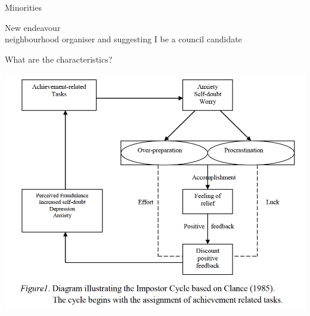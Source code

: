 \documentclass[aspectratio=169]{beamer}
\begin{document}
\begin{frame}
  \begin{center}
    \Huge Minorities
    \\ \small \cite{apa13}
  \end{center}
\end{frame}

\begin{frame}
  \begin{center}
    \Huge New endeavour
    \\ \small \cite{apa13}
     neighbourhood organiser and suggesting I be a council candidate
  \end{center}
\end{frame}

\begin{frame}
  \begin{center}
    \Huge What are the characteristics?
  \end{center}
\end{frame}

\begin{frame}
  \begin{center}
    \includegraphics[scale=.5]{./assets/clance-impostor-cycle.png}
    \\ \small \cite{sakulku11}
  \end{center}
\end{frame}
\end{document}
